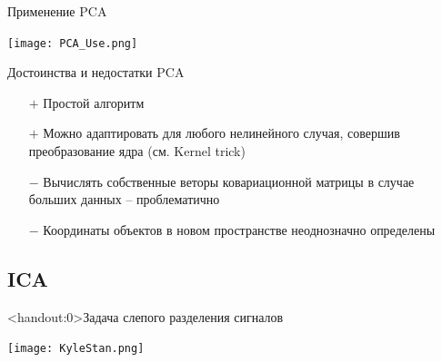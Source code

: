 \documentclass[pdf, intlimits, 9pt, unicode]{beamer}
\begin{document}
\begin{frame}{Применение PCA}\begin{center}\texttt{[image: PCA\_Use.png]}\end{center}\end{frame}



\begin{frame}{Достоинства и недостатки PCA}

\begin{itemize}
\item[$+$] Простой алгоритм
\item[$+$] Можно адаптировать для любого нелинейного случая, совершив преобразование ядра (см. Kernel trick)\pause
\item[$-$] Вычислять собственные веторы ковариационной матрицы в случае больших данных -- проблематично\pause
\item[$-$] Координаты объектов в новом пространстве неоднозначно определены
\end{itemize}\pause

\end{frame}




\subsection{ICA}

\begin{frame}<handout:0>{Задача слепого разделения сигналов}
\begin{center}\texttt{[image: KyleStan.png]}\end{center}
\end{frame}
\end{document}

